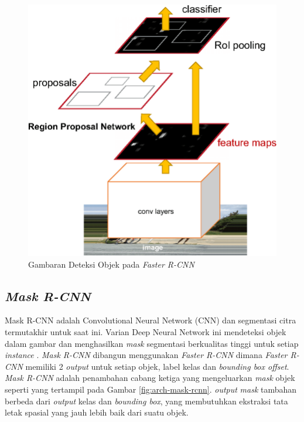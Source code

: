 \begin{figure}[h]
	\centering
	\includegraphics[scale=0.15]{gambar/arch-faster-rcnn.png}
	\caption{Gambaran Deteksi Objek pada \textit{Faster R-CNN} \citep{arch-faster-rcnn}}
	\label{fig:faster-rcnn}
\end{figure}

\subsection{\textit{Mask R-CNN}}
\label{subsec:mask-rcnn}

Mask R-CNN adalah Convolutional Neural Network (CNN) dan segmentasi citra termutakhir untuk saat ini. Varian Deep Neural Network ini mendeteksi objek dalam gambar dan menghasilkan \textit{mask} segmentasi berkualitas tinggi untuk setiap \textit{instance} \citep{mask-rcnn}. \textit{Mask R-CNN} dibangun menggunakan\textit{ Faster R-CNN} dimana \textit{Faster R-CNN} memiliki 2 \textit{output} untuk setiap objek, label kelas dan \textit{bounding box offset}. \textit{Mask R-CNN} adalah penambahan cabang ketiga yang mengeluarkan \textit{mask} objek seperti yang tertampil pada Gambar \ref{fig:arch-mask-rcnn}. \textit{output} \textit{mask} tambahan berbeda dari \textit{output} kelas dan \textit{bounding box}, yang membutuhkan ekstraksi tata letak spasial yang jauh lebih baik dari suatu objek.

